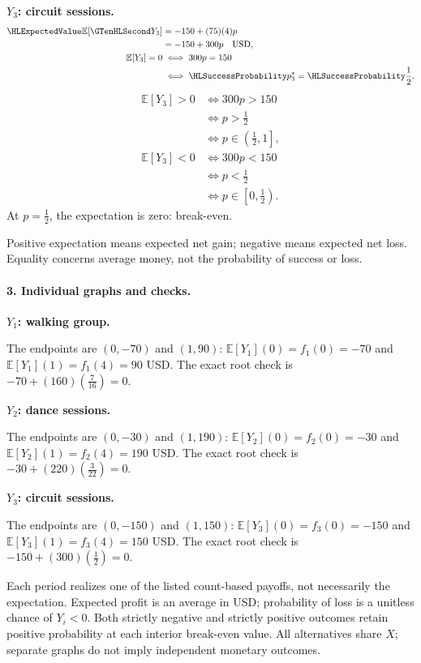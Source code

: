 \par\noindent\begin{minipage}[t]{.48\linewidth}\vspace{0pt}
\textbf{$Y_3$: circuit sessions.}
\[
\begin{aligned}
\ExpectedValue{\mathbb E}[\Money{Y_3}]&=-150+(75)(4)p\\
&=-150+300p\quad\text{USD},\\
\mathbb E[Y_3]=0&\iff 300p=150\\
&\iff \SuccessProb{p_3^*}=\SuccessProb{\frac{1}{2}}.
\end{aligned}
\]
\[
\begin{aligned}
\mathbb E[Y_3]>0&\iff 300p>150\\
&\iff p>\frac{1}{2}\\
&\iff p\in \left(\frac{1}{2},1\right],\\
\mathbb E[Y_3]<0&\iff 300p<150\\
&\iff p<\frac{1}{2}\\
&\iff p\in \left[0,\frac{1}{2}\right).
\end{aligned}
\]
At $p=\frac{1}{2}$, the expectation is zero: break-even.
\end{minipage}\par
Positive expectation means expected net gain; negative means expected net loss. Equality concerns average money, not the probability of success or loss.
\clearpage\paragraph{3. Individual graphs and checks.}
\textbf{$Y_1$: walking group.}
\begin{center}\end{center}
The endpoints are $(0,-70)$ and $(1,90)$: $\mathbb E[Y_1](0)=f_1(0)=-70$ and
$\mathbb E[Y_1](1)=f_1(4)=90$ USD.
The exact root check is $-70+(160)(\frac{7}{16})=0$.
\par\medskip
\textbf{$Y_2$: dance sessions.}
\begin{center}\end{center}
The endpoints are $(0,-30)$ and $(1,190)$: $\mathbb E[Y_2](0)=f_2(0)=-30$ and
$\mathbb E[Y_2](1)=f_2(4)=190$ USD.
The exact root check is $-30+(220)(\frac{3}{22})=0$.
\par\medskip
\clearpage
\textbf{$Y_3$: circuit sessions.}
\begin{center}\end{center}
The endpoints are $(0,-150)$ and $(1,150)$: $\mathbb E[Y_3](0)=f_3(0)=-150$ and
$\mathbb E[Y_3](1)=f_3(4)=150$ USD.
The exact root check is $-150+(300)(\frac{1}{2})=0$.
\par\medskip
Each period realizes one of the listed count-based payoffs, not necessarily the expectation.
Expected profit is an average in USD; probability of loss is a unitless chance of $Y_i<0$.
Both strictly negative and strictly positive outcomes retain positive probability at each interior break-even value.
All alternatives share $X$; separate graphs do not imply independent monetary outcomes.

